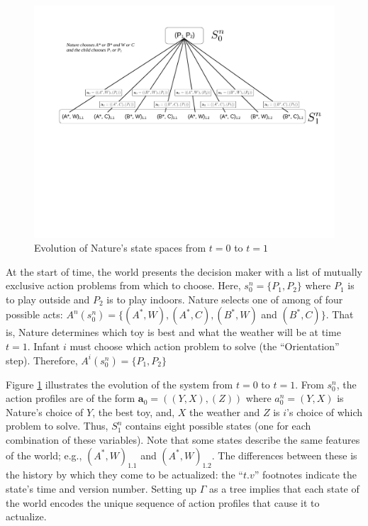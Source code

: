 \documentclass[
11pt,
titlepage,
reqno,
]{article}%
\theoremstyle{definition}
\begin{document}
\begin{figure}[h!]
	\centering
	\includegraphics*[page=1,trim = 0in 4in 0in 0in,scale=.6]{Awareness_Diagrams_All}
	\caption{Evolution of Nature's state spaces from $t=0$ to $t=1$\label{Diag: p-01}}%
\end{figure}

At the start of time, the world presents the decision maker with a list of mutually exclusive action problems from which to choose. 
Here, $s^n_0=\{P_1,P_2\}$ where $P_1$ is to play outside and $P_2$ is to play indoors.
Nature selects one of among of four possible acts: $A^n(s^n_0)=\{(A^\ast,W),(A^\ast,C),(B^\ast,W)$ and $(B^\ast,C)\}$.
That is, Nature determines which toy is best and what the weather will be at time $t=1$.
Infant $i$ must choose which action problem to solve (the ``Orientation'' step).
Therefore, $A^i(s^n_0)=\{P_1,P_2\}$

Figure \ref{Diag: p-01} illustrates the evolution of the system from $t=0$ to $t=1$. 
From $s^n_0$, the action profiles are of the form $\mathbf{a}_0=((Y,X),(Z))$ where $a^n_0=(Y,X)$ is Nature's choice of  $Y$, the best toy, and, $X$ the weather and $Z$ is $i$'s choice of which problem to solve.
Thus, $S^n_1$ contains eight possible states (one for each combination of these variables).
Note that some states describe the same features of the world; e.g., $(A^\ast,W)_{1.1}$ and $(A^\ast,W)_{1.2}$. 
The differences between these is the history by which they come to be actualized: the ``$t.v$'' footnotes indicate the state's time and version number.
Setting up $\Gamma$ as a tree implies that each state of the world encodes the unique sequence of action profiles that cause it to actualize. 	
\end{document}
